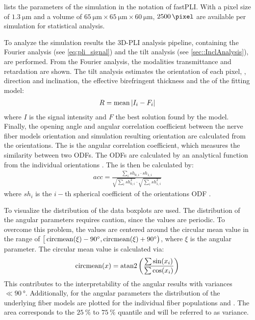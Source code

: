 %
 lists the parameters of the simulation in the notation of \ac{fastPLI}.
With a pixel size of $\SI{1.3}{\micro\meter}$ and a volume of $\SI{65}{\micro\meter} \times \SI{65}{\micro\meter} \times \SI{60}{\micro\meter}$, $\SI{2500}{\pixel}$ are available per simulation for statistical analysis.
\par
%
To analyze the simulation results the \ac{3D-PLI} analysis pipeline, containing the Fourier analysis (see \cref{eq:pli_signal}) and the tilt analysis (see \cref{sec::InclAnalysis}), are performed.
From the Fourier analysis, the modalities transmittance and retardation are shown.
The tilt analysis estimates the orientation of each pixel, \ie{}, direction and inclination, the effective birefringent thickness \trel{} and the \rvalue{} of the fitting model:
\begin{align}
    R = \operatorname{mean}{|I_i-F_i|} \label{eq:rvalue}
\end{align}
where $I$ is the signal intensity and $F$ the best solution found by the model.
Finally, the opening angle \openingAngle{} and angular correlation coefficient \accvalue{} between the nerve fiber models orientation and simulation resulting orientation are calculated from the orientations.
The \accvalue{} is the angular correlation coefficient, which measures the similarity between two \acp{ODF}. The \acp{ODF} are calculated by an analytical function from the individual orientations \cite{Alimi2020}.
The \accvalue{} is then be calculated by:
\begin{align}
    acc = \frac{\sum_i{\mathit{sh}_{0,i} \cdot \mathit{sh}_{1,i}}}{\sqrt{\sum_i{\mathit{sh}_{0,i}^2}} \cdot \sqrt{\sum_i{\mathit{sh}_{1,i}^2}}}
\end{align}
where $\mathit{sh}_i$ is the $i-$th spherical coefficient of the orientations \ac{ODF} \cite{Schilling2018}.
\par
%
To visualize the distribution of the data boxplots are used.
The distribution of the angular parameters requires caution, since the values are periodic.
To overcome this problem, the values are centered around the circular mean value in the range of $\big[\operatorname{circmean} (\xi)-\SI{90}{\degree}, \operatorname{circmean}(\xi)+\SI{90}{\degree}\big)$, where $\xi$ is the angular parameter.
The circular mean value is calculated via:
\begin{align}
    \operatorname{circmean}(x) = \operatorname{atan2} \left ( \frac{\sum \sin(x_i) }{\sum \cos(x_i) } \right )
\end{align}
This contributes to the interpretability of the angular results with variances $\ll \SI{90}{\degree}$.
Additionally, for the angular parameters the distribution of the underlying fiber models are plotted for the individual fiber populations \popa{} and \popb{}.
The area corresponds to the $\SI{25}{\percent}$ to $\SI{75}{\percent}$ quantile and will be referred to as \bvariance{} variance.
%
%
%
